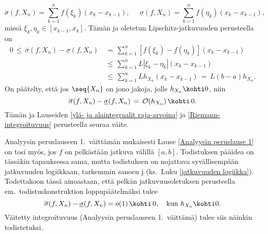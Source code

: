 \[
\overline{\sigma}(f,X_n)=\sum_{k=1}^n f(\xi_k)(x_k-x_{k-1}), \quad\,\
\underline{\sigma}(f,X_n)=\sum_{k=1}^n f(\eta_k)(x_k-x_{k-1}),
\]
missä $\xi_k,\eta_k\in[x_{k-1},x_k]$. Tämän ja oletetun Lipschitz-jatkuvuuden perusteella on
\begin{align*}
0 \,\le\, \overline{\sigma}(f,X_n)-\underline{\sigma}(f,X_n)
 &\,=\, \sum_{k=1}^n[f(\xi_k)-f(\eta_k)](x_k-x_{k-1}) \\
 &\,\le\, \sum_{k=1}^n L|\xi_k-\eta_k|(x_k-x_{k-1}) \\
 &\,\le\, \sum_{k=1}^n Lh_{X_n}(x_k-x_{k-1}) \,=\, L(b-a)h_{X_n}.
\end{align*}
On päätelty, että jos $\seq{X_n}$ on jono jakoja, jolle $h_{X_n} \kohti 0$, niin
\[
\overline{\sigma}(f,X_n)-\underline{\sigma}(f,X_n)\,=\,\mathcal{O}(h_{X_n})\,\kohti\,0.
\]
Tämän ja Lauseiden \ref{ylä- ja alaintegraalit raja-arvoina} ja \ref{Riemann-integroituvuus}
perusteella seuraa väite. \loppu

Analyysin peruslauseen 1.\ väittämän mukaisesti Lause \ref{Analyysin peruslause 1} on tosi myös,
jos $f$ on pelkästään jatkuva välillä $[a,b]$. Todistuksen pääidea on tässäkin tapauksessa sama,
mutta todistuksen on nojattava syvällisempään jatkuvuuden logiikkaan, tarkemmin sanoen
\pain{tasaiseen} j\pain{atkuvuuteen} (ks.\ Luku \ref{jatkuvuuden logiikka}). Todettakoon tässä
ainoastaan, että pelkän jatkuvuusoletuksen perusteella em.\ todistuskonstruktion
loppupäätelmäksi tulee
\[
\overline{\sigma}(f,X_n)-\underline{\sigma}(f,X_n) = o(1)
                  \,\kohti\,0, \quad \text{kun}\ h_{X_n} \kohti 0.
\]
Väitetty integroituvuus (Analyysin peruslauseen 1.\ väittämä) tulee siis näinkin todistetuksi.

